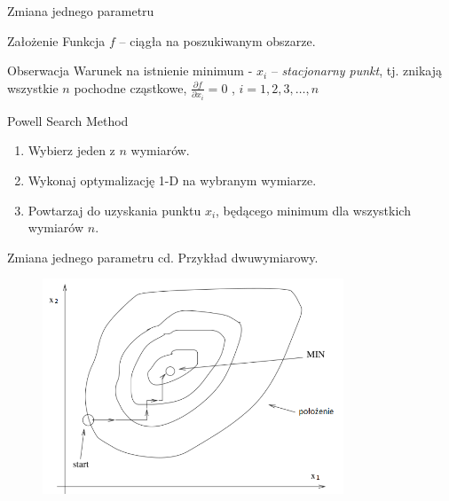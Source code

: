   \begin{frame}{Zmiana jednego parametru}
    \begin{block}{Założenie}
      Funkcja $f$ -- ciągła na poszukiwanym obszarze.
    \end{block}
    \begin{block}{Obserwacja}
        Warunek na istnienie minimum - $ x_i $ -- \emph{stacjonarny punkt},
        tj. znikają wszystkie $n$ pochodne cząstkowe, $ \frac{\partial f}{\partial x_i} = 0 $ , $ i = 1,2,3,\ldots ,n $
    \end{block}
    \begin{block}{Powell Search Method}
        \begin{enumerate}
          \item Wybierz jeden z $n$ wymiarów.
          \item Wykonaj optymalizację 1-D na wybranym wymiarze.
          \item Powtarzaj do uzyskania punktu $x_i$, będącego minimum dla wszystkich wymiarów $n$.
        \end{enumerate}
    \end{block}
  \end{frame}

  \begin{frame}{Zmiana jednego parametru cd.}
    Przykład dwuwymiarowy.
	\begin{figure}
		\centering
		\includegraphics[height=0.6\textheight ,width=0.8\textwidth]{img/17/change_param_1}
	\end{figure}

  \end{frame}

